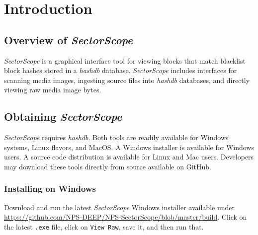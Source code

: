 \documentclass[11pt,fleqn]{article} %
\begin{document}
\newcommand \sscope {\textit{SectorScope}\xspace}
\newcommand \hdb {\textit{hashdb}\xspace}
\newcommand \aut {\textit{Autopsy}\xspace}
\newcommand \bulk {\textbf{bulk\_extractor}\xspace}
\newcommand \mdd {\textbf{md5deep}\xspace}
\newcommand \fiwalk {\textbf{fiwalk}\xspace}





\setlength{\parindent}{0pt} %
\newpage
\thispagestyle{empty}
\mbox{}
\newpage

\tableofcontents
\newpage
{}
\newpage

\section{Introduction}
\subsection {Overview of \sscope}
\sscope is a graphical interface tool for viewing blocks that match blacklist block hashes stored in a \hdb database. \sscope includes interfaces for scanning media images, ingesting source files into \hdb databases, and directly viewing raw media image bytes.\\

\subsection{Obtaining \sscope}
\label{Obtaining}
\sscope requires \hdb. Both tools are readily available for Windows systems, Linux flavors, and MacOS.  A Windows installer is available for Windows users.  A source code distribution is available for Linux and Mac users.  Developers may download these tools directly from source available on GitHub.\\

\subsubsection{Installing on Windows}
Download and run the latest \sscope Windows installer available under \url{https://github.com/NPS-DEEP/NPS-SectorScope/blob/master/build}. Click on the latest \verb+.exe+ file, click on \verb+View Raw+, save it, and then run that.\\
\end{document}
